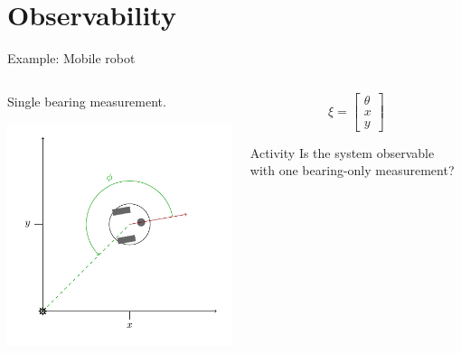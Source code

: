 \documentclass[presentation,aspectratio=169]{beamer}
\begin{document}
\section{Observability}
\label{sec:orgbf5acea}
\begin{frame}[label={sec:orgb7cccdf}]{Example: Mobile robot}
\begin{columns}
\begin{column}{0.4\columnwidth}
Single bearing measurement.

\begin{center}
 \includegraphics[width=1.0\linewidth]{../../figures/unicycle-model-bearing}
\end{center}
\end{column}
\begin{column}{0.6\columnwidth}
\[ \xi = \begin{bmatrix} \theta\\x\\y \end{bmatrix}\]

\pause

\alert{Activity} Is the system observable with one bearing-only measurement?
\end{column}
\end{columns}
\end{frame}
\end{document}
